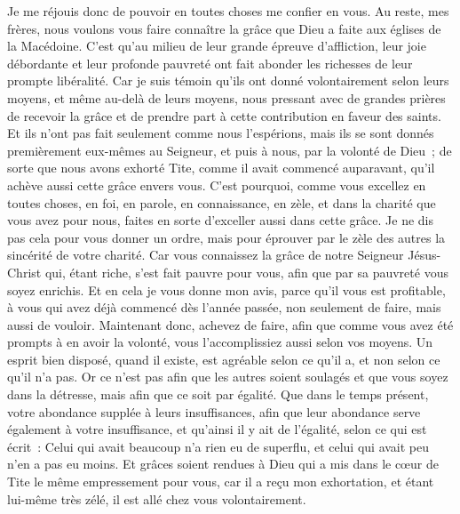 \begin{multicols}{2}
Je me réjouis donc de pouvoir en toutes choses me confier en vous.
\VerseOne{}Au reste, mes frères, nous voulons vous faire connaître la grâce que Dieu a faite aux églises de la Macédoine.
C'est qu'au milieu de leur grande épreuve d'affliction, leur joie débordante et leur profonde pauvreté ont fait abonder les richesses de leur prompte libéralité.
Car je suis témoin qu'ils ont donné volontairement selon leurs moyens, et même au-delà de leurs moyens,
nous pressant avec de grandes prières de recevoir la grâce et de prendre part à cette contribution en faveur des saints.
Et ils n'ont pas fait seulement comme nous l'espérions, mais ils se sont donnés premièrement eux-mêmes au Seigneur, et puis à nous, par la volonté de Dieu~;
de sorte que nous avons exhorté Tite, comme il avait commencé auparavant, qu'il achève aussi cette grâce envers vous.
C'est pourquoi, comme vous excellez en toutes choses, en foi, en parole, en connaissance, en zèle, et dans la charité que vous avez pour nous, faites en sorte d'exceller aussi dans cette grâce.
Je ne dis pas cela pour vous donner un ordre, mais pour éprouver par le zèle des autres la sincérité de votre charité.
Car vous connaissez la grâce de notre Seigneur Jésus-Christ qui, étant riche, s'est fait pauvre pour vous, afin que par sa pauvreté vous soyez enrichis.
Et en cela je vous donne mon avis, parce qu'il vous est profitable, à vous qui avez déjà commencé dès l'année passée, non seulement de faire, mais aussi de vouloir.
Maintenant donc, achevez de faire, afin que comme vous avez été prompts à en avoir la volonté, vous l'accomplissiez aussi selon vos moyens.
Un esprit bien disposé, quand il existe, est agréable selon ce qu'il a, et non selon ce qu'il n'a pas.
Or ce n'est pas afin que les autres soient soulagés et que vous soyez dans la détresse, mais afin que ce soit par égalité. Que dans le temps présent, votre abondance supplée à leurs insuffisances,
afin que leur abondance serve également à votre insuffisance, et qu'ainsi il y ait de l'égalité,
selon ce qui est écrit~: Celui qui avait beaucoup n'a rien eu de superflu, et celui qui avait peu n'en a pas eu moins.
Et grâces soient rendues à Dieu qui a mis dans le cœur de Tite le même empressement pour vous,
car il a reçu mon exhortation, et étant lui-même très zélé, il est allé chez vous volontairement.

\end{multicols}
